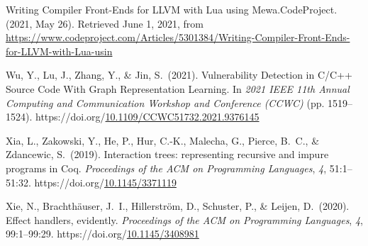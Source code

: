 \documentclass[12pt,twoside]{article}
\begin{document}
{\begin{thebibliography}{1079}
\mdbibitemlabel{}Writing Compiler Front-Ends for LLVM with Lua using Mewa.CodeProject. (2021, May 26). Retrieved June 1, 2021, from \href{https://www.codeproject.com/Articles/5301384/Writing-Compiler-Front-Ends-for-LLVM-with-Lua-usin}{{\ttfamily https://\hspace{0pt}www.\hspace{0pt}codeproject.\hspace{0pt}com/\hspace{0pt}Articles/\hspace{0pt}5301384/\hspace{0pt}Writing-\hspace{0pt}Compiler-\hspace{0pt}Front-\hspace{0pt}Ends-\hspace{0pt}for-\hspace{0pt}LLVM-\hspace{0pt}with-\hspace{0pt}Lua-\hspace{0pt}usin}}%

\mdbibitemlabel{}Wu, Y., Lu, J., Zhang, Y., \& Jin, S.~(2021). Vulnerability Detection in C/C++ Source Code With Graph Representation Learning. In \emph{2021 IEEE 11th Annual Computing and Communication Workshop and Conference (CCWC)} (pp. 1519–1524). https://doi.org/\href{https://dx.doi.org/10.1109/CCWC51732.2021.9376145}{10.1109/CCWC51732.2021.9376145}%

\mdbibitemlabel{}Xia, L., Zakowski, Y., He, P., Hur, C.-K., Malecha, G., Pierce, B.~C., \& Zdancewic, S.~(2019). Interaction trees: representing recursive and impure programs in Coq. \emph{Proceedings of the ACM on Programming Languages}, \emph{4}, 51:1–51:32. https://doi.org/\href{https://dx.doi.org/10.1145/3371119}{10.1145/3371119}%

\mdbibitemlabel{}Xie, N., Brachthäuser, J.~I., Hillerström, D., Schuster, P., \& Leijen, D.~(2020). Effect handlers, evidently. \emph{Proceedings of the ACM on Programming Languages}, \emph{4}, 99:1–99:29. https://doi.org/\href{https://dx.doi.org/10.1145/3408981}{10.1145/3408981}%


\end{thebibliography}}
\end{document}
